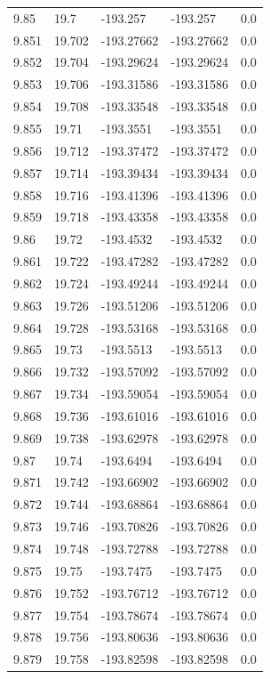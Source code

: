 \begin{tabular}{lllll}
9.85 & 19.7 & -193.257 & -193.257 & 0.0 \\
9.851 & 19.702 & -193.27662 & -193.27662 & 0.0 \\
9.852 & 19.704 & -193.29624 & -193.29624 & 0.0 \\
9.853 & 19.706 & -193.31586 & -193.31586 & 0.0 \\
9.854 & 19.708 & -193.33548 & -193.33548 & 0.0 \\
9.855 & 19.71 & -193.3551 & -193.3551 & 0.0 \\
9.856 & 19.712 & -193.37472 & -193.37472 & 0.0 \\
9.857 & 19.714 & -193.39434 & -193.39434 & 0.0 \\
9.858 & 19.716 & -193.41396 & -193.41396 & 0.0 \\
9.859 & 19.718 & -193.43358 & -193.43358 & 0.0 \\
9.86 & 19.72 & -193.4532 & -193.4532 & 0.0 \\
9.861 & 19.722 & -193.47282 & -193.47282 & 0.0 \\
9.862 & 19.724 & -193.49244 & -193.49244 & 0.0 \\
9.863 & 19.726 & -193.51206 & -193.51206 & 0.0 \\
9.864 & 19.728 & -193.53168 & -193.53168 & 0.0 \\
9.865 & 19.73 & -193.5513 & -193.5513 & 0.0 \\
9.866 & 19.732 & -193.57092 & -193.57092 & 0.0 \\
9.867 & 19.734 & -193.59054 & -193.59054 & 0.0 \\
9.868 & 19.736 & -193.61016 & -193.61016 & 0.0 \\
9.869 & 19.738 & -193.62978 & -193.62978 & 0.0 \\
9.87 & 19.74 & -193.6494 & -193.6494 & 0.0 \\
9.871 & 19.742 & -193.66902 & -193.66902 & 0.0 \\
9.872 & 19.744 & -193.68864 & -193.68864 & 0.0 \\
9.873 & 19.746 & -193.70826 & -193.70826 & 0.0 \\
9.874 & 19.748 & -193.72788 & -193.72788 & 0.0 \\
9.875 & 19.75 & -193.7475 & -193.7475 & 0.0 \\
9.876 & 19.752 & -193.76712 & -193.76712 & 0.0 \\
9.877 & 19.754 & -193.78674 & -193.78674 & 0.0 \\
9.878 & 19.756 & -193.80636 & -193.80636 & 0.0 \\
9.879 & 19.758 & -193.82598 & -193.82598 & 0.0 \\

\end{tabular}

